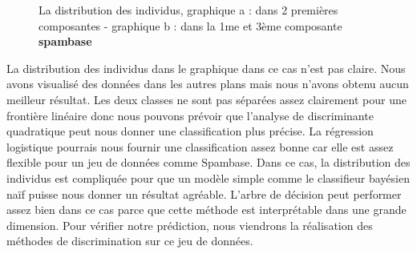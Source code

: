 \documentclass[a4paper,11pt,oneside,roman]{article}
\begin{document}
\begin{figure}[htb]
\begin{tabular}{ccc}
    \end{tabular}
    \caption{La distribution des individus, graphique a : dans 2 premières composantes - graphique b : dans la 1me et 3ème composante \textbf{spambase}}
    \label{fig:my_label}
\end{figure}
\newline
La distribution des individus dans le graphique dans ce cas n'est pas claire. Nous avons visualisé des données dans les autres plans mais nous n'avons obtenu aucun meilleur résultat. Les deux classes ne sont pas séparées assez clairement pour une frontière linéaire donc nous pouvons prévoir que l'analyse de discriminante quadratique peut nous donner une classification plus précise. La régression logistique pourrais nous fournir une classification assez bonne car elle est assez flexible pour un jeu de données comme Spambase. Dans ce cas, la distribution des individus est compliquée pour que un modèle simple comme le classifieur bayésien naïf puisse nous donner un résultat agréable. L'arbre de décision peut performer assez bien dans ce cas parce que cette méthode est interprétable dans une grande dimension. Pour vérifier notre prédiction, nous viendrons la réalisation des méthodes de discrimination sur ce jeu de données.
\end{document}
